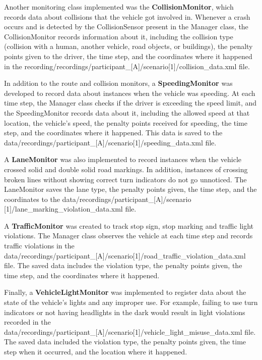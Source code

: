 Another monitoring class implemented was the \textbf{CollisionMonitor}, which records data about collisions that the vehicle got involved in. Whenever a crash occurs and is detected by the CollisionSensor present in the Manager class, the CollisionMonitor records information about it, including the collision type (collision with a human, another vehicle, road objects, or buildings), the penalty points given to the driver, the time step, and the coordinates where it happened in the recording/recordings/participant\_[A]/scenario[1]/collision\_data.xml file.

In addition to the route and collision monitors, a \textbf{SpeedingMonitor} was developed to record data about instances when the vehicle was speeding. At each time step, the Manager class checks if the driver is exceeding the speed limit, and the SpeedingMonitor records data about it, including the allowed speed at that location, the vehicle's speed, the penalty points received for speeding, the time step, and the coordinates where it happened. This data is saved to the data/recordings/participant\_[A]/scenario[1]/speeding\_data.xml file.

A \textbf{LaneMonitor} was also implemented to record instances when the vehicle crossed solid and double solid road markings. In addition, instances of crossing broken lines without showing correct turn indicators do not go unnoticed. The LaneMonitor saves the lane type, the penalty points given, the time step, and the coordinates to the data/recordings/participant\_[A]/scenario
[1]/lane\_marking\_violation\_data.xml file.

A \textbf{TrafficMonitor} was created to track stop sign, stop marking and traffic light violations. The Manager class observes the vehicle at each time step and records traffic violations in the data/recordings/participant\_[A]/scenario[1]/road\_traffic\_violation\_data.xml file. The saved data includes the violation type, the penalty points given, the time step, and the coordinates where it happened.

Finally, a \textbf{VehicleLightMonitor} was implemented to register data about the state of the vehicle's lights and any improper use. For example, failing to use turn indicators or not having headlights in the dark would result in light violations recorded in the data/recordings/participant\_[A]/scenario[1]/vehicle\_light\_misuse\_data.xml file. The saved data included the violation type, the penalty points given, the time step when it occurred, and the location where it happened.

